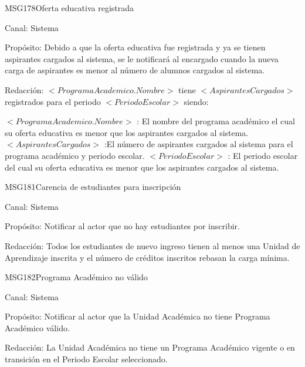 \begin{mensaje}{MSG178}{Oferta educativa registrada}
	\item[Canal:] Sistema
	\item[Propósito:] Debido a que la oferta educativa fue registrada y ya se tienen aspirantes cargados al sistema, se le notificará al encargado cuando la nueva carga de aspirantes es menor al número de alumnos cargados al sistema.
	\item[Redacción:] $<ProgramaAcademico.Nombre>$ tiene $<AspirantesCargados>$ registrados para el periodo $<PeriodoEscolar>$
		siendo:
		\begin{Titemize}
			\Titem $<ProgramaAcademico.Nombre>$ : El nombre del programa académico el cual su oferta educativa es menor que los aspirantes cargados al sistema.
			\Titem $<AspirantesCargados>$ :El número de aspirantes cargados al sistema para el programa académico y periodo escolar.
			\Titem $<PeriodoEscolar>$ : El periodo escolar del cual su oferta educativa es menor que los aspirantes cargados al sistema.
		\end{Titemize}
\end{mensaje}

\begin{mensaje}{MSG181}{Carencia de estudiantes para inscripción}
	\item[Canal:] Sistema
	\item[Propósito:] Notificar al actor que no hay estudiantes por inscribir.
	\item[Redacción:] Todos los estudiantes de nuevo ingreso tienen al menos una Unidad de Aprendizaje inscrita y el número de créditos inscritos rebasan la carga mínima.
\end{mensaje}

\begin{mensaje}{MSG182}{Programa Académico no válido}
	\item[Canal:] Sistema
	\item[Propósito:] Notificar al actor que la Unidad Académica no tiene Programa Académico válido.
	\item[Redacción:] La Unidad Académica no tiene un Programa Académico vigente o en transición en el Periodo Escolar seleccionado.
\end{mensaje}

